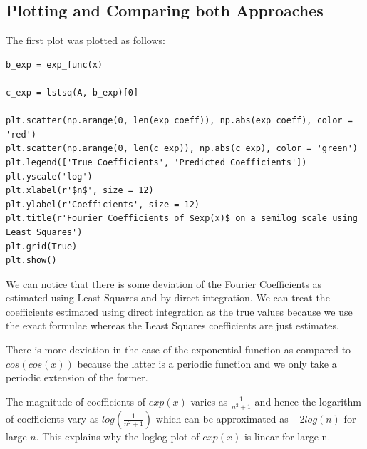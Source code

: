 \documentclass{article}
\begin{document}
\subsection{Plotting and Comparing both Approaches}
The first plot was plotted as follows:
\begin{verbatim}
b_exp = exp_func(x)

c_exp = lstsq(A, b_exp)[0]

plt.scatter(np.arange(0, len(exp_coeff)), np.abs(exp_coeff), color = 'red')
plt.scatter(np.arange(0, len(c_exp)), np.abs(c_exp), color = 'green')
plt.legend(['True Coefficients', 'Predicted Coefficients'])
plt.yscale('log')
plt.xlabel(r'$n$', size = 12)
plt.ylabel(r'Coefficients', size = 12)
plt.title(r'Fourier Coefficients of $exp(x)$ on a semilog scale using Least Squares')
plt.grid(True)
plt.show()
\end{verbatim}
We can notice that there is some deviation of the Fourier Coefficients as estimated using Least Squares and by direct integration. We can treat the coefficients estimated using direct integration as the true values because we use the exact formulae whereas the Least Squares coefficients are just estimates.

There is more deviation in the case of the exponential function as compared to $cos(cos(x))$ because the latter is a periodic function and we only take a periodic extension of the former.

The magnitude of coefficients of $exp(x)$ varies as $\frac{1}{n^{2}+1}$ and hence the logarithm of coefficients vary as $log(\frac{1}{n^{2}+1})$ which can be approximated as $-2log(n)$ for large $n$. This explains why the loglog plot of $exp(x)$ is linear for large n.
\end{document}
